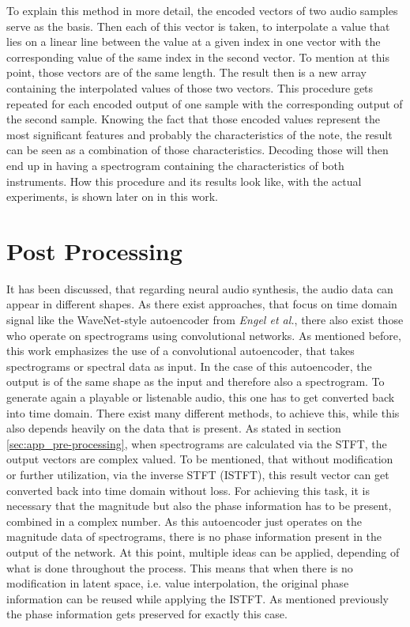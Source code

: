 To explain this method in more detail, the encoded vectors of two audio samples serve as the basis. Then each of this vector is taken, to interpolate a value that lies on a linear line between the value at a given index in one vector with the corresponding value of the same index in the second vector. To mention at this point, those vectors are of the same length. The result then is a new array containing the interpolated values of those two vectors. This procedure gets repeated for each encoded output of one sample with the corresponding output of the second sample. Knowing the fact that those encoded values represent the most significant features and probably the characteristics of the note, the result can be seen as a combination of those characteristics. Decoding those will then end up in having a spectrogram containing the characteristics of both instruments. How this procedure and its results look like, with the actual experiments, is shown later on in this work. 

\section{Post Processing}
\label{sec:app_post_processing}
It has been discussed, that regarding neural audio synthesis, the audio data can appear in different shapes. As there exist approaches, that focus on time domain signal like the WaveNet-style autoencoder from \textit{Engel et al.}, there also exist those who operate on spectrograms using convolutional networks. As mentioned before, this work emphasizes the use of a convolutional autoencoder, that takes spectrograms or spectral data as input. In the case of this autoencoder, the output is of the same shape as the input and therefore also a spectrogram. To generate again a playable or listenable audio, this one has to get converted back into time domain. There exist many different methods, to achieve this, while this also depends heavily on the data that is present. As stated in section \ref{sec:app_pre-processing}, when spectrograms are calculated via the STFT, the output vectors are complex valued. To be mentioned, that without modification or further utilization, via the inverse STFT (ISTFT), this result vector can get converted back into time domain without loss. For achieving this task, it is necessary that the magnitude but also the phase information has to be present, combined in a complex number. As this autoencoder just operates on the magnitude data of spectrograms, there is no phase information present in the output of the network. At this point, multiple ideas can be applied, depending of what is done throughout the process. This means that when there is no modification in latent space, i.e. value interpolation, the original phase information can be reused while applying the ISTFT. As mentioned previously the phase information gets preserved for exactly this case. 

